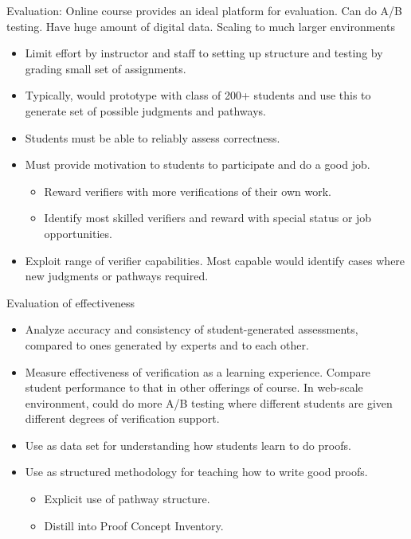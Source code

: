 \documentclass[12pt]{article}
\begin{document}
Evaluation: Online course provides an ideal platform for evaluation.
Can do A/B testing.  Have huge amount of digital data.
Scaling to much larger environments

\begin{itemize}
\item Limit effort by instructor and staff to setting up structure and
  testing by grading small set of assignments.
\item Typically, would prototype with class of 200+ students and
  use this to generate set of possible judgments and pathways.
\item Students must be able to reliably assess correctness.
\item Must provide motivation to students to participate and do a good job.
\begin{itemize}
\item Reward verifiers with more verifications of their own work.
\item Identify most skilled verifiers and reward with special status
  or job opportunities.
\end{itemize}
\item Exploit range of verifier capabilities.  Most capable would
  identify cases where new judgments or pathways required.
\end{itemize}

Evaluation of effectiveness

\begin{itemize}
\item Analyze accuracy and consistency of student-generated
  assessments, compared to ones generated by experts and to each other.
\item Measure effectiveness of verification as a learning experience.
  Compare student performance to that in other offerings of course.
  In web-scale environment, could do more A/B testing where different
  students are given different degrees of verification support.
\item Use as data set for understanding how students learn to do proofs.
\item Use as structured methodology for teaching how to write good proofs.
\begin{itemize}
\item Explicit use of pathway structure.
\item Distill into Proof Concept Inventory.
\end{itemize}

\end{itemize}
\end{document}
